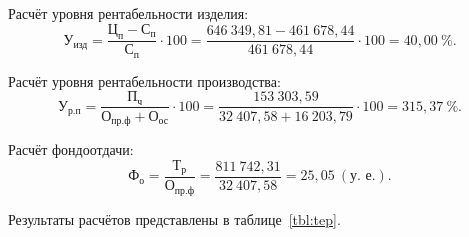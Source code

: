 Расчёт уровня рентабельности изделия:
\begin{equation*}
  \text{У}_{\text{изд}} =
  \dfrac{\text{Ц}_{\text{п}} - \text{С}_{\text{п}}}{\text{С}_{\text{п}}} \cdot 100 =
  \dfrac{646~349{,}81 - 461~678{,}44}{461~678{,}44} \cdot 100 = 40{,}00 ~ \%.
\end{equation*}

Расчёт уровня рентабельности производства:
\begin{equation*}
  \text{У}_{\text{р.п}} =
  \dfrac{\text{П}_{\text{ч}}}{\text{О}_{\text{пр.ф}} + \text{О}_{\text{ос}}} \cdot 100 =
  \dfrac{153~303{,}59}{32~407{,}58 + 16~203{,}79} \cdot 100 = 315{,}37~\%.
\end{equation*}

Расчёт фондоотдачи:
\begin{equation*}
  \text{Ф}_{\text{о}} =
  \dfrac{\text{Т}_{\text{р}}}{\text{О}_{\text{пр.ф}}} =
  \dfrac{811~742{,}31}{32~407{,}58} = 25{,}05~(\text{у.~е.}).
\end{equation*}

Результаты расчётов представлены в таблице~\ref{tbl:tep}.

